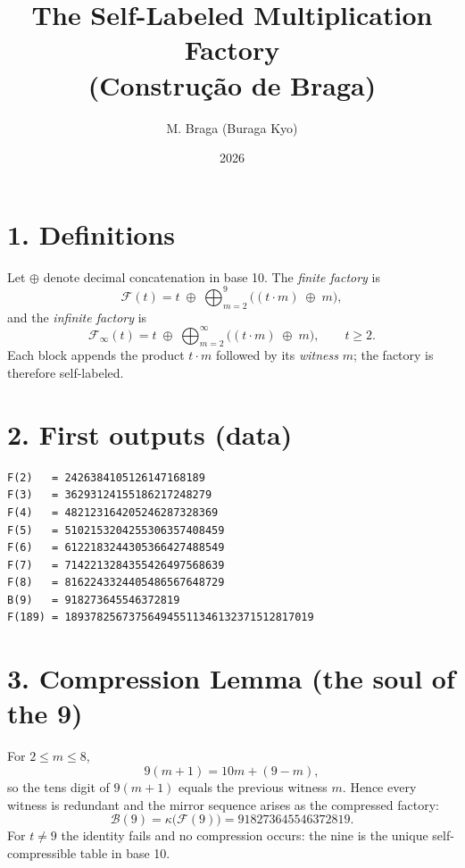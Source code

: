 \documentclass[11pt]{article}
\title{The Self-Labeled Multiplication Factory\\ \large (Constru\c{c}\~ao de Braga)}
\author{M. Braga (Buraga Kyo)}
\date{2026}
\newcommand{\cat}{\oplus} %
\begin{document}
\maketitle

\section*{1. Definitions}
Let $\cat$ denote decimal concatenation in base 10. The \emph{finite factory} is
\[
\mathcal{F}(t) = t \;\cat\; \bigoplus_{m=2}^{9}\big((t\cdot m)\;\cat\; m\big),
\]
and the \emph{infinite factory} is
\[
\mathcal{F}_{\infty}(t) = t \;\cat\; \bigoplus_{m=2}^{\infty}\big((t\cdot m)\;\cat\; m\big),
\qquad t \ge 2.
\]
Each block appends the product $t\cdot m$ followed by its \emph{witness} $m$;
the factory is therefore self-labeled.

\section*{2. First outputs (data)}
\begin{verbatim}
F(2)   = 2426384105126147168189
F(3)   = 36293124155186217248279
F(4)   = 482123164205246287328369
F(5)   = 5102153204255306357408459
F(6)   = 6122183244305366427488549
F(7)   = 7142213284355426497568639
F(8)   = 8162243324405486567648729
B(9)   = 918273645546372819
F(189) = 189378256737564945511346132371512817019
\end{verbatim}

\section*{3. Compression Lemma (the soul of the 9)}
For $2 \le m \le 8$,
\[
9(m+1) = 10m + (9-m),
\]
so the tens digit of $9(m+1)$ equals the previous witness $m$. Hence every
witness is redundant and the mirror sequence arises as the compressed factory:
\[
\mathcal{B}(9) = \kappa\big(\mathcal{F}(9)\big) = 918273645546372819.
\]
For $t \neq 9$ the identity fails and no compression occurs: the nine is the
unique self-compressible table in base 10.
\end{document}
